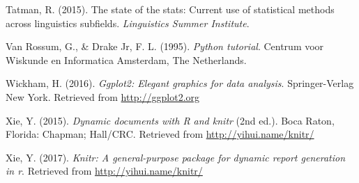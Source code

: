\documentclass[english,,man]{apa6}
\begin{document}
\leavevmode\hypertarget{ref-tatman2015}{}%
Tatman, R. (2015). The state of the stats: Current use of statistical methods across linguistics subfields. \emph{Linguistics Summer Institute}.

\leavevmode\hypertarget{ref-van1995python}{}%
Van Rossum, G., \& Drake Jr, F. L. (1995). \emph{Python tutorial}. Centrum voor Wiskunde en Informatica Amsterdam, The Netherlands.

\leavevmode\hypertarget{ref-ggplot2}{}%
Wickham, H. (2016). \emph{Ggplot2: Elegant graphics for data analysis}. Springer-Verlag New York. Retrieved from \url{http://ggplot2.org}

\leavevmode\hypertarget{ref-knitr}{}%
Xie, Y. (2015). \emph{Dynamic documents with R and knitr} (2nd ed.). Boca Raton, Florida: Chapman; Hall/CRC. Retrieved from \url{http://yihui.name/knitr/}

\leavevmode\hypertarget{ref-knitrmanual}{}%
Xie, Y. (2017). \emph{Knitr: A general-purpose package for dynamic report generation in r}. Retrieved from \url{http://yihui.name/knitr/}
\end{document}
